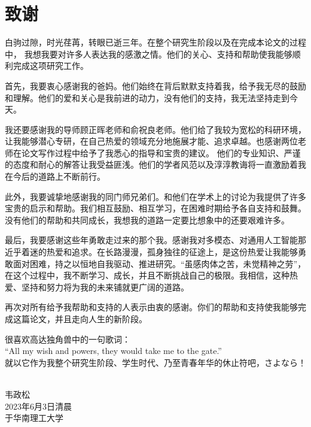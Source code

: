 \chapter{致\texorpdfstring{\quad}{}谢}
白驹过隙，时光荏苒，转眼已逝三年。在整个研究生阶段以及在完成本论文的过程中，
我想我要对许多人表达我的感激之情。他们的关心、支持和帮助使我能够顺利完成这项研究工作。

首先，我要衷心感谢我的爸妈。他们始终在背后默默支持着我，给予我无尽的鼓励和理解。他们的爱和关心是我前进的动力，没有他们的支持，我无法坚持走到今天。 

我还要感谢我的导师顾正晖老师和俞祝良老师。他们给了我较为宽松的科研环境，让我能够潜心专研，在自己热爱的领域充分地施展才能、追求卓越。也感谢两位老师在论文写作过程中给予了我悉心的指导和宝贵的建议。
他们的专业知识、严谨的态度和耐心的解答让我受益匪浅。他们的学者风范以及淳淳教诲将一直激励着我在今后的道路上不断前行。 

此外，我要诚挚地感谢我的同门师兄弟们。和他们在学术上的讨论为我提供了许多宝贵的启示和帮助。我们相互鼓励、相互学习，在困难时期给予各自支持和鼓舞。没有他们的帮助和共同成长，我想我的道路一定要比想象中的还要艰难许多。

最后，我要感谢这些年勇敢走过来的那个我。感谢我对多模态、对通用人工智能那近乎着迷的热爱和追求。在长路漫漫，孤身独往的征途上，是这份热爱让我能够勇敢面对困难，持之以恒地自我驱动、推进研究。“虽感肉体之苦，未觉精神之劳”，
在这个过程中，我不断学习、成长，并且不断挑战自己的极限。我相信，这种热爱、坚持和努力将为我的未来铺就更广阔的道路。

再次对所有给予我帮助和支持的人表示由衷的感谢。你们的帮助和支持使我能够完成这篇论文，并且走向人生的新阶段。
~\\
\begin{center}
	很喜欢高达独角兽中的一句歌词：
	~\\
	“All my wish and powers, they would take me to the gate.” 
	~\\
	就以它作为我整个研究生阶段、学生时代、乃至青春年华的休止符吧，さよなら！
	~\\
\end{center}


\begin{minipage}[t]{0.945\textwidth}%
	\begin{flushright}
		韦政松\\
		2023年6月3日清晨 \\	%
		于华南理工大学
		\par\end{flushright}
\end{minipage}

